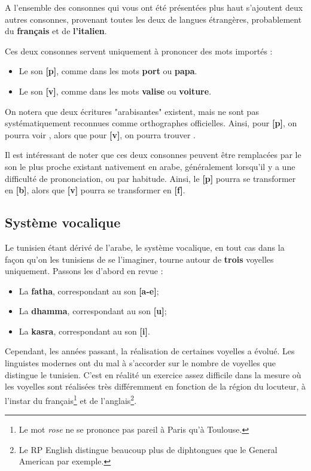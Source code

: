 A l'ensemble des consonnes qui vous ont été présentées plus haut s'ajoutent deux autres consonnes, provenant toutes les deux de langues étrangères, probablement du \textbf{français} et de \textbf{l'italien}.

Ces deux consonnes servent uniquement à prononcer des mots importés : 
\begin{itemize}
    \item Le son \textbf{[p]}, comme dans les mots \textbf{port} ou \textbf{papa}.
    \item Le son \textbf{[v]}, comme dans les mots \textbf{valise} ou \textbf{voiture}.
\end{itemize}

On notera que deux écritures "arabisantes" existent, mais ne sont pas systématiquement reconnues comme orthographes officielles. Ainsi, pour \textbf{[p]}, on pourra voir , alors que pour \textbf{[v]}, on pourra trouver .

Il est intéressant de noter que ces deux consonnes peuvent être remplacées par le son le plus proche existant nativement en arabe, généralement lorsqu'il y a une difficulté de prononciation, ou par habitude. Ainsi, le \textbf{[p]} pourra se transformer en \textbf{[b]}, alors que \textbf{[v]} pourra se transformer en \textbf{[f]}.

\subsection{Système vocalique}\label{Système vocalique}
Le tunisien étant dérivé de l'arabe, le système vocalique, en tout cas dans la façon qu'on les tunisiens de se l'imaginer, tourne autour de \textbf{trois} voyelles uniquement. Passons les d'abord en revue :
\begin{itemize}
    \item La \textbf{fatha}, correspondant au son \textbf{[a-e]};
    \item La \textbf{dhamma}, correspondant au son \textbf{[u]};
    \item La \textbf{kasra}, correspondant au son \textbf{[i]}.
\end{itemize}

Cependant, les années passant, la réalisation de certaines voyelles a évolué. Les linguistes modernes ont du mal à s'accorder sur le nombre de voyelles que distingue le tunisien. C'est en réalité un exercice assez difficile dans la mesure où les voyelles sont réalisées très différemment en fonction de la région du locuteur, à l'instar du français\footnote{Le mot \textit{rose} ne se prononce pas pareil à Paris qu'à Toulouse.} et de l'anglais\footnote{Le RP English distingue beaucoup plus de diphtongues que le General American par exemple.}. 

